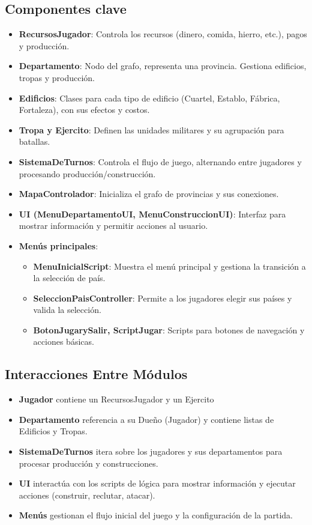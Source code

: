 \documentclass[a4paper,12pt]{article}
\begin{document}
\subsection{Componentes clave}
\begin{itemize}
    \item \textbf{RecursosJugador}: Controla los recursos (dinero, comida, hierro, etc.), pagos y producción.
    \item \textbf{Departamento}: Nodo del grafo, representa una provincia. Gestiona edificios, tropas y producción.
    \item \textbf{Edificios}: Clases para cada tipo de edificio (Cuartel, Establo, Fábrica, Fortaleza), con sus efectos y costos.
    \item \textbf{Tropa y Ejercito}: Definen las unidades militares y su agrupación para batallas.
    \item \textbf{SistemaDeTurnos}: Controla el flujo de juego, alternando entre jugadores y procesando producción/construcción.
    \item \textbf{MapaControlador}: Inicializa el grafo de provincias y sus conexiones.
    \item \textbf{UI (MenuDepartamentoUI, MenuConstruccionUI)}: Interfaz para mostrar información y permitir acciones al usuario.
    \item \textbf{Menús principales}: 
        \begin{itemize}
            \item \textbf{MenuInicialScript}: Muestra el menú principal y gestiona la transición a la selección de país.
            \item \textbf{SeleccionPaisController}: Permite a los jugadores elegir sus países y valida la selección.
            \item \textbf{BotonJugarySalir, ScriptJugar}: Scripts para botones de navegación y acciones básicas.
        \end{itemize}
\end{itemize}


\subsection{Interacciones Entre Módulos}

\begin{itemize}
    \item \textbf{Jugador} contiene un RecursosJugador y un Ejercito
    \item \textbf{Departamento} referencia a su Dueño (Jugador) y contiene listas de Edificios y Tropas.
    \item \textbf{SistemaDeTurnos} itera sobre los jugadores y sus departamentos para procesar producción y construcciones.
    \item \textbf{UI} interactúa con los scripts de lógica para mostrar información y ejecutar acciones (construir, reclutar, atacar).
    \item \textbf{Menús} gestionan el flujo inicial del juego y la configuración de la partida.
\end{itemize}
\end{document}

